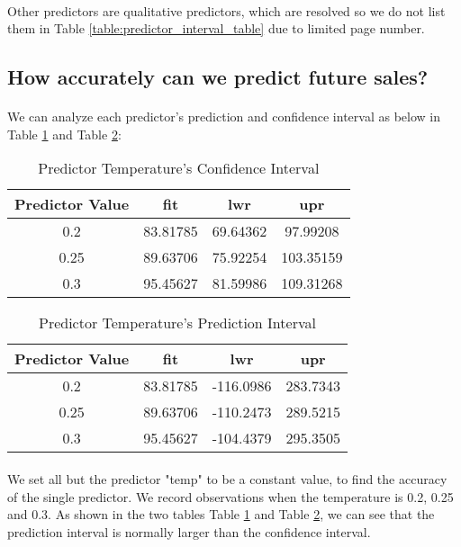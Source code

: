\documentclass{article}[]
\begin{document}
\paragraph{}
Other predictors are qualitative predictors, which are resolved so we do not list them in Table \ref{table:predictor_interval_table} due to limited page number.

\subsection{How accurately can we predict future sales?}
\paragraph{}
We can analyze each predictor's prediction and confidence interval as below in Table \ref{table:confidence_interval_table} and Table \ref{table:prediction_interval_table}:
\begin{table}
\caption{Predictor Temperature's Confidence Interval}
\centering
\begin{tabular}{c|c|c|c}
\hline
{\bf Predictor Value}&{\bf fit}&{\bf lwr}&{\bf upr}\\
\hline
0.2 &83.81785 &69.64362  &97.99208\\
0.25 &89.63706 &75.92254 &103.35159\\
0.3 &95.45627 &81.59986 &109.31268\\
\hline
\end{tabular}
\label{table:confidence_interval_table}
\end{table}

\begin{table}
\caption{Predictor Temperature's Prediction Interval}
\centering
\begin{tabular}{c|c|c|c}
\hline
{\bf Predictor Value}&{\bf fit}&{\bf lwr}&{\bf upr}\\
\hline
0.2 &83.81785 &-116.0986 &283.7343\\
0.25 &89.63706 &-110.2473 &289.5215\\
0.3 &95.45627 &-104.4379 &295.3505\\
\hline
\end{tabular}
\label{table:prediction_interval_table}
\end{table}

\paragraph{}
We set all but the predictor "temp" to be a constant value, to find the accuracy of the single predictor. We record observations when the temperature is 0.2, 0.25 and 0.3. As shown in the two tables Table \ref{table:confidence_interval_table} and Table \ref{table:prediction_interval_table}, we can see that the prediction interval is normally larger than the confidence interval.
\end{document}

